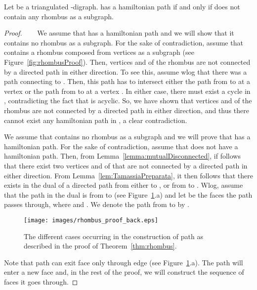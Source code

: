 \documentclass{myllncs-mixalis}
\begin{document}
\begin{theorem}
\label{thm:rhombus}
Let  be a triangulated -digraph.  has a hamiltonian path
if and only if  does not contain any rhombus as a subgraph.
\end{theorem}

\begin{proof}

~~~  We assume that  has a hamiltonian path and we
will show that it contains no rhombus as a subgraph. For the sake of
contradiction,  assume that  contains a rhombus composed from
vertices  as a subgraph (see
Figure~\ref{fig:rhombusProof}). Then, vertices  and   of the
rhombus are not connected by a directed path in either direction. To
see this, assume wlog that there was a path connecting  to .
Then, this path has to intersect either the path from  to
 at a vertex  or the path from   to  at a vertex
. In either case, there must exist a cycle in , contradicting
the fact that  is acyclic. So, we have shown that vertices 
and  of the rhombus are not connected  by a directed path in
either direction, and thus there cannot exist any hamiltonian path
in , a clear contradiction.


 We assume that  contains no rhombus as a subgraph
and we will prove that  has a hamiltonian path. For the sake of
contradiction, assume that  does not have a hamiltonian path.
Then, from Lemma~\ref{lemma:mutualDisconnected}, if follows that
there exist two vertices  and  of  that are not connected
by a directed path in either direction. From
Lemma~\ref{lem:TamassiaPreparata}, it then follows that there exists
in the dual  of  a directed path from either  to
, or from  to . Wlog, assume that the
path in the dual  is from  to   (see
Figure~\ref{fig:rhombusProofBack}.a) and let  be the faces the path passes through, where  and
. We denote the path from  to  by
.

\begin{figure}[tb]
    \begin{minipage}{\textwidth}
    \centering
    \texttt{[image: images/rhombus\_proof\_back.eps]}
    \caption{The different cases occurring in  the construction of path  as described in
    the proof of Theorem~\ref{thm:rhombus}.}
    \label{fig:rhombusProofBack}
  \end{minipage}
\end{figure}

Note that path  can exit face
 only through edge
 (see Figure~\ref{fig:rhombusProofBack}.a). The path will
enter a new face and, in the rest of the proof, we will construct
the sequence of faces it goes through.


\end{proof}
\end{document}
